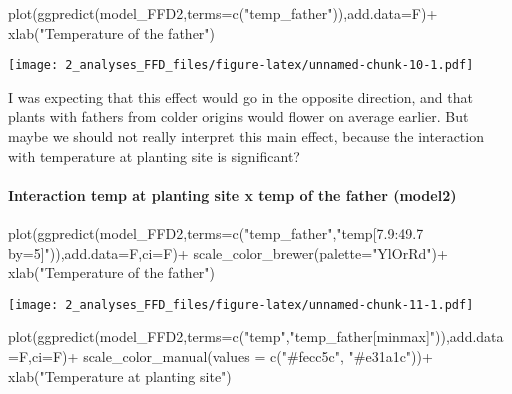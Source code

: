 \documentclass[
]{article}
\newenvironment{Shaded}{\begin{snugshade}}{\end{snugshade}}
\newcommand{\AttributeTok}[1]{\textcolor[rgb]{0.77,0.63,0.00}{#1}}
\newcommand{\FunctionTok}[1]{\textcolor[rgb]{0.00,0.00,0.00}{#1}}
\newcommand{\NormalTok}[1]{#1}
\newcommand{\SpecialCharTok}[1]{\textcolor[rgb]{0.00,0.00,0.00}{#1}}
\newcommand{\StringTok}[1]{\textcolor[rgb]{0.31,0.60,0.02}{#1}}
\begin{document}
\begin{Shaded}
\begin{Highlighting}[]
\FunctionTok{plot}\NormalTok{(}\FunctionTok{ggpredict}\NormalTok{(model\_FFD2,}\AttributeTok{terms=}\FunctionTok{c}\NormalTok{(}\StringTok{"temp\_father"}\NormalTok{)),}\AttributeTok{add.data=}\NormalTok{F)}\SpecialCharTok{+}
  \FunctionTok{xlab}\NormalTok{(}\StringTok{"Temperature of the father"}\NormalTok{)}
\end{Highlighting}
\end{Shaded}

\texttt{[image: 2\_analyses\_FFD\_files/figure-latex/unnamed-chunk-10-1.pdf]}

I was expecting that this effect would go in the opposite direction, and
that plants with fathers from colder origins would flower on average
earlier. But maybe we should not really interpret this main effect,
because the interaction with temperature at planting site is
significant?

\hypertarget{interaction-temp-at-planting-site-x-temp-of-the-father-model2}{%
\paragraph{Interaction temp at planting site x temp of the father
(model2)}\label{interaction-temp-at-planting-site-x-temp-of-the-father-model2}}

\begin{Shaded}
\begin{Highlighting}[]
\FunctionTok{plot}\NormalTok{(}\FunctionTok{ggpredict}\NormalTok{(model\_FFD2,}\AttributeTok{terms=}\FunctionTok{c}\NormalTok{(}\StringTok{"temp\_father"}\NormalTok{,}\StringTok{"temp[7.9:49.7 by=5]"}\NormalTok{)),}\AttributeTok{add.data=}\NormalTok{F,}\AttributeTok{ci=}\NormalTok{F)}\SpecialCharTok{+}
  \FunctionTok{scale\_color\_brewer}\NormalTok{(}\AttributeTok{palette=}\StringTok{"YlOrRd"}\NormalTok{)}\SpecialCharTok{+}
  \FunctionTok{xlab}\NormalTok{(}\StringTok{"Temperature of the father"}\NormalTok{)}
\end{Highlighting}
\end{Shaded}

\texttt{[image: 2\_analyses\_FFD\_files/figure-latex/unnamed-chunk-11-1.pdf]}

\begin{Shaded}
\begin{Highlighting}[]
\FunctionTok{plot}\NormalTok{(}\FunctionTok{ggpredict}\NormalTok{(model\_FFD2,}\AttributeTok{terms=}\FunctionTok{c}\NormalTok{(}\StringTok{"temp"}\NormalTok{,}\StringTok{"temp\_father[minmax]"}\NormalTok{)),}\AttributeTok{add.data=}\NormalTok{F,}\AttributeTok{ci=}\NormalTok{F)}\SpecialCharTok{+}
  \FunctionTok{scale\_color\_manual}\NormalTok{(}\AttributeTok{values =} \FunctionTok{c}\NormalTok{(}\StringTok{"\#fecc5c"}\NormalTok{, }\StringTok{"\#e31a1c"}\NormalTok{))}\SpecialCharTok{+}
  \FunctionTok{xlab}\NormalTok{(}\StringTok{"Temperature at planting site"}\NormalTok{)}
\end{Highlighting}
\end{Shaded}
\end{document}
